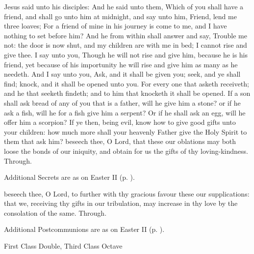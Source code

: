 
 Jesus said unto his disciples: And he said unto them, Which of you shall have a friend, and shall go unto him at midnight, and say unto him, Friend, lend me three loaves; For a friend of mine in his journey is come to me, and I have nothing to set before him? And he from within shall answer and say, Trouble me not: the door is now shut, and my children are with me in bed; I cannot rise and give thee. I say unto you, Though he will not rise and give him, because he is his friend, yet because of his importunity he will rise and give him as many as he needeth. And I say unto you, Ask, and it shall be given you; seek, and ye shall find; knock, and it shall be opened unto you. For every one that asketh receiveth; and he that seeketh findeth; and to him that knocketh it shall be opened. If a son shall ask bread of any of you that is a father, will he give him a stone? or if he ask a fish, will he for a fish give him a serpent? Or if he shall ask an egg, will he offer him a scorpion? If ye then, being evil, know how to give good gifts unto your children: how much more shall your heavenly Father give the Holy Spirit to them that ask him?
\secret
{} beseech thee, O Lord, that these our oblations may both loose the bonds of our iniquity, and obtain for us the gifts of thy loving-kindness. Through.
\begin{rubric}
    Additional Secrets are as on Easter II (p. \pageref{EasterII}).
\end{rubric}
\postcommunion
{} beseech thee, O Lord, to further with thy gracious favour these our supplications: that we, receiving thy gifts in our tribulation, may increase in thy love by the consolation of the same. Through.
\begin{rubric}
    Additional Postcommunions are as on Easter II (p. \pageref{EasterII}).
\end{rubric}

\begin{inhead}
    {First Class Double, Third Class Octave}
\end{inhead}
\par\noindent
{}

